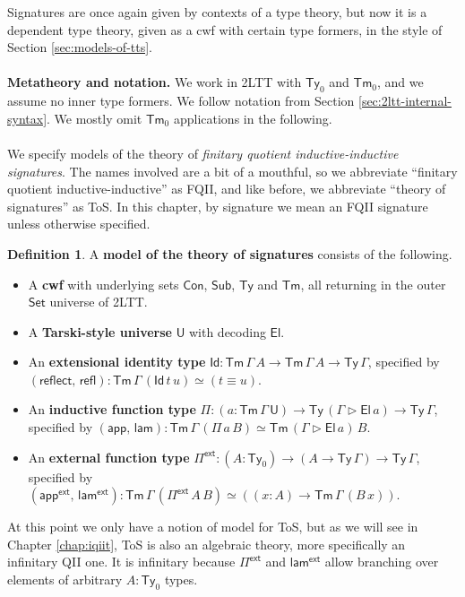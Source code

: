 \documentclass[12pt,a4paper,twoside,openany]{book}
\theoremstyle{remark}
\theoremstyle{definition}
\newtheorem{mydefinition}{Definition}
\theoremstyle{theorem}
\newcommand{\ms}[1]{\mathsf{#1}}
\newcommand{\refl}{\mathsf{refl}}
\newcommand{\reflect}{\mathsf{reflect}}
\newcommand{\Con}{\mathsf{Con}}
\newcommand{\Sub}{\mathsf{Sub}}
\newcommand{\Tm}{\mathsf{Tm}}
\newcommand{\Ty}{\mathsf{Ty}}
\newcommand{\U}{\mathsf{U}}
\newcommand{\El}{\mathsf{El}}
\newcommand{\Id}{\mathsf{Id}}
\newcommand{\Set}{\mathsf{Set}}
\newcommand{\ext}{\triangleright}
\newcommand{\Pie}{\Pi^{\mathsf{ext}}}
\newcommand{\appe}{\mathsf{app^{ext}}}
\newcommand{\lame}{\mathsf{lam^{ext}}}
\newcommand{\app}{\ms{app}}
\newcommand{\lam}{\ms{lam}}
\begin{document}
Signatures are once again given by contexts of a type theory, but now it is a
dependent type theory, given as a cwf with certain type formers, in the style
of Section \ref{sec:models-of-tts}.
\\\\
\textbf{Metatheory and notation.} We work in 2LTT with $\Ty_0$ and $\Tm_0$, and
we assume no inner type formers.  We follow notation from Section
\ref{sec:2ltt-internal-syntax}. We mostly omit $\Tm_0$ applications in the
following.
\\\\
We specify models of the theory of \emph{finitary quotient
inductive-inductive signatures}. The names involved are a bit of a mouthful, so
we abbreviate ``finitary quotient inductive-inductive'' as FQII, and like
before, we abbreviate ``theory of signatures'' as ToS. In this chapter, by
signature we mean an FQII signature unless otherwise specified.

\begin{mydefinition}
\label{def:fqiit-tos}
A \textbf{model of the theory of signatures} consists of the following.
  \begin{itemize}
    \item A \textbf{cwf} with underlying sets $\Con$, $\Sub$, $\Ty$ and $\Tm$, all returning in
      the outer $\Set$ universe of 2LTT.
    \item A \textbf{Tarski-style universe} $\U$ with decoding $\El$.
    \item An \textbf{extensional identity type} $\Id : \Tm\,\Gamma\,A \to
      \Tm\,\Gamma\,A \to \Ty\,\Gamma$, specified by $(\reflect,\,\refl) :
      \Tm\,\Gamma\,(\Id\,t\,u) \simeq (t \equiv u)$.
    \item An \textbf{inductive function type} $\Pi : (a : \Tm\,\Gamma\,\U) \to
      \Ty\,(\Gamma\ext\El\,a) \to \Ty\,\Gamma$, specified by
      $(\app,\,\lam) : \Tm\,\Gamma\,(\Pi\,a\,B) \simeq \Tm\,(\Gamma \ext \El\,a)\,B$.
    \item An \textbf{external function type} $\Pie : (A : \Ty_0) \to (A \to \Ty\,\Gamma) \to \Ty\,\Gamma$, specified by
      $(\appe,\,\lame) : \Tm\,\Gamma\,(\Pie\,A\,B) \simeq ((x : A) \to \Tm\,\Gamma\,(B\,x))$.
  \end{itemize}
\end{mydefinition}
At this point we only have a notion of model for ToS, but as we will see in
Chapter \ref{chap:iqiit}, ToS is also an algebraic theory, more specifically an
infinitary QII one. It is infinitary because $\Pie$ and $\lame$ allow branching
over elements of arbitrary $A : \Ty_0$ types.
\end{document}

